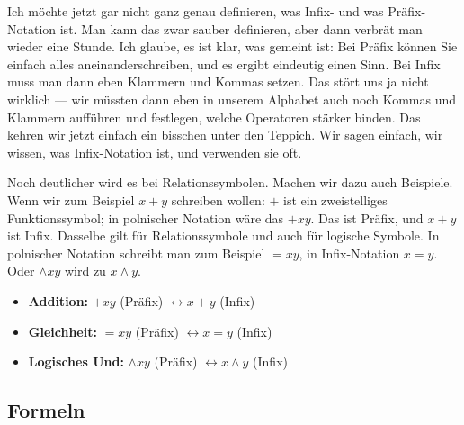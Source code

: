 \begin{spoken-clean}[00:55:59 - 00:57:29]
Ich möchte jetzt gar nicht ganz genau definieren, was Infix- und was Präfix-Notation ist. Man kann das zwar sauber definieren, aber dann verbrät man wieder eine Stunde. Ich glaube, es ist klar, was gemeint ist: Bei Präfix können Sie einfach alles aneinanderschreiben, und es ergibt eindeutig einen Sinn. Bei Infix muss man dann eben Klammern und Kommas setzen. Das stört uns ja nicht wirklich --- wir müssten dann eben in unserem Alphabet auch noch Kommas und Klammern aufführen und festlegen, welche Operatoren stärker binden. Das kehren wir jetzt einfach ein bisschen unter den Teppich. Wir sagen einfach, wir wissen, was Infix-Notation ist, und verwenden sie oft. 

Noch deutlicher wird es bei Relationssymbolen. Machen wir dazu auch Beispiele. Wenn wir zum Beispiel $x + y$ schreiben wollen: $+$ ist ein zweistelliges Funktionssymbol; in polnischer Notation wäre das $+xy$. Das ist Präfix, und $x + y$ ist Infix. Dasselbe gilt für Relationssymbole und auch für logische Symbole. In polnischer Notation schreibt man zum Beispiel $=xy$, in Infix-Notation $x = y$. Oder $\wedge xy$ wird zu $x \wedge y$.
\end{spoken-clean}

\begin{math-stroke}
\begin{itemize}
    \item \textbf{Addition:} $+ x y$ (Präfix) $\leftrightarrow x + y$ (Infix)
    \item \textbf{Gleichheit:} $= x y$ (Präfix) $\leftrightarrow x = y$ (Infix)
    \item \textbf{Logisches Und:} $\wedge x y$ (Präfix) $\leftrightarrow x \wedge y$ (Infix)
\end{itemize}
\end{math-stroke}

\subsection{Formeln}

